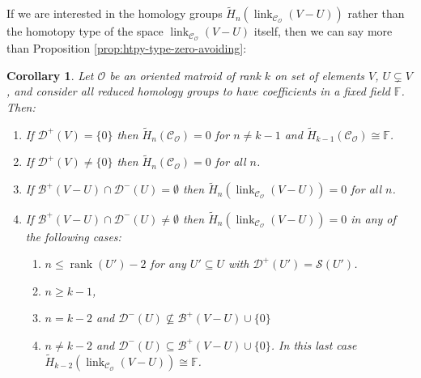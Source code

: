 \documentclass[a4paper,11pt,reqno, english]{amsart}
\newtheorem{corollary}[theorem]{Corollary}
\theoremstyle{definition}
\theoremstyle{remark}
\DeclareMathOperator{\link}{\mathrm{link}}
\begin{document}
If we are interested in the homology groups $\tilde{H}_n(\link_{\mathscr{C}_\mathscr{O}}(V-U))$ rather than the homotopy type of the space $\link_{\mathscr{C}_\mathscr{O}}(V-U)$ itself, then we can say more than Proposition \ref{prop:htpy-type-zero-avoiding}:
\begin{corollary}\label{crl:homology-of-zero-avoiding}
    Let $\mathscr{O}$ be an oriented matroid of rank $k$ on set of elements $V$, $U\subsetneq V$, and consider all reduced homology groups to have coefficients in a fixed field $\mathbb{F}$. Then:
    \begin{enumerate}[label=\normalfont{(\arabic*)}]
        \item\label{crl:homology-of-zero-avoiding:complex-sphere} If $\mathscr{D}^+(V)=\{0\}$ then $\tilde{H}_n(\mathscr{C}_\mathscr{O})=0$ for $n\neq k-1$ and $\tilde{H}_{k-1}(\mathscr{C}_\mathscr{O})\cong\mathbb{F}$.
        \item\label{crl:homology-of-zero-avoiding:complex-pt} If $\mathscr{D}^+(V)\neq\{0\}$ then $\tilde{H}_n(\mathscr{C}_\mathscr{O})=0$ for all $n$. 
        \item\label{crl:homology-of-zero-avoiding:link-contr} If $\mathscr{B}^+(V-U)\cap\mathscr{D}^-(U)=\emptyset$ then $\tilde{H}_n(\link_{\mathscr{C}_\mathscr{O}}(V-U))=0$ for all $n$.
        \item\label{crl:homology-of-zero-avoiding:link-nontrivial} If $\mathscr{B}^+(V-U)\cap\mathscr{D}^-(U)\neq\emptyset$ then $\tilde{H}_n(\link_{\mathscr{C}_\mathscr{O}}(V-U))=0$ in any of the following cases:
        \begin{enumerate}[label=\normalfont{(4\alph*)}]
            \item\label{crl:homology-of-zero-avoiding:link-nontrivial:upper-bound} $n\leq \operatorname{rank}(U')-2$ for any $U'\subseteq U$ with $\mathscr{D}^+(U')=\mathscr{S}(U')$.
            \item\label{crl:homology-of-zero-avoiding:link-nontrivial:lower-bound} $n\geq k-1$,
            \item\label{crl:homology-of-zero-avoiding:link-nontrivial:pass-to-boundary} $n=k-2$ and $\mathscr{D}^-(U)\nsubseteq\mathscr{B}^+(V-U)\cup\{0\}$
            \item\label{crl:homology-of-zero-avoiding:link-nontrivial:sphere} $n\neq k-2$ and $\mathscr{D}^-(U)\subseteq\mathscr{B}^+(V-U)\cup\{0\}$. In this last case $\tilde{H}_{k-2}(\link_{\mathscr{C}_\mathscr{O}}(V-U))\cong \mathbb{F}$.
        \end{enumerate}
    \end{enumerate}
\end{corollary}
\end{document}
